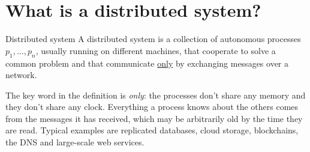 
\newcommand{\runningexample}{%
  \proc{2}{p_1}{7.6}
  \proc{1}{p_2}{7.6}
  \proc{0}{p_3}{7.6}
  \node[ev] (a1) at (1.0,2) {};
  \node[ev] (a2) at (3.0,2) {};
  \node[ev] (a3) at (6.2,2) {};
  \node[ev] (b1) at (2.2,1) {};
  \node[ev] (b2) at (3.4,1) {};
  \node[ev] (b3) at (6.8,1) {};
  \node[ev] (c1) at (1.0,0) {};
  \node[ev] (c2) at (4.4,0) {};
  \node[ev] (c3) at (5.2,0) {};
  \draw[msg] (a1) -- node[lbl, above right=-1pt] {$m_1$} (b1);
  \draw[msg] (b2) -- node[lbl, above right=-1pt] {$m_2$} (c2);
  \draw[msg] (c3) -- node[lbl, right] {$m_3$} (a3);
}



\newcommand{\dsproc}[6]{%
  \draw[RoyalBlue, fill=gray!12] (#1,#2) rectangle ++(3.2,1.1);
  \node[RoyalBlue, font=\small] at (#1+1.6,#2+0.78) {#3};
  \node[font=\scriptsize] at (#1+1.6,#2+0.3) {state: $#4$};
  \draw[RoyalBlue!60] (#1+0.5,#2) rectangle ++(0.75,-0.85);
  \draw[RoyalBlue!60] (#1+1.95,#2) rectangle ++(0.75,-0.85);
  \node[font=\tiny, anchor=north] at (#1+0.875,#2-0.85) {$\InBuf$};
  \node[font=\tiny, anchor=north] at (#1+2.325,#2-0.85) {$\OutBuf$};
  \ifstrempty{#5}{}{\node[mbox] at (#1+0.875,#2-0.42) {$#5$};}
  \ifstrempty{#6}{}{\node[mbox] at (#1+2.325,#2-0.42) {$#6$};}
}

\section{What is a distributed system?}

\begin{frameddefn}{Distributed system}
  A distributed system is a collection of autonomous processes $p_1, \ldots, p_n$, usually running on different machines, that cooperate to solve a common problem and that communicate \underline{only} by exchanging messages over a network.
\end{frameddefn}

The key word in the definition is \textit{only}: the processes don't share any memory and they don't share any clock. Everything a process knows about the others comes from the messages it has received, which may be arbitrarily old by the time they are read. Typical examples are replicated databases, cloud storage, blockchains, the DNS and large-scale web services.

